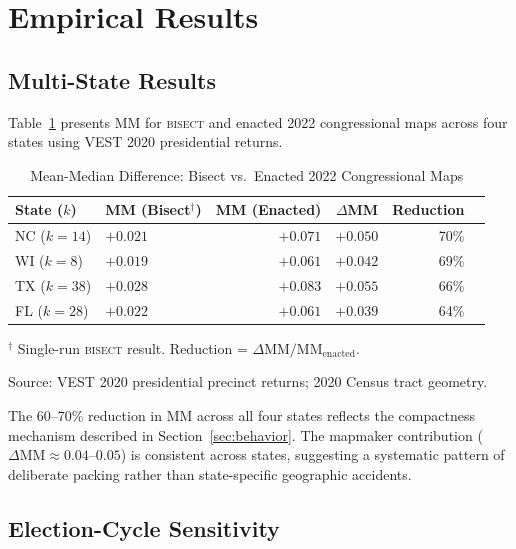 \section{Empirical Results}
\label{sec:empirical}

\subsection{Multi-State Results}

Table~\ref{tab:mm-baseline} presents MM for \textsc{bisect} and enacted 2022
congressional maps across four states using VEST 2020 presidential returns.

\begin{table}[ht]
\centering
\caption{Mean-Median Difference: Bisect vs.\ Enacted 2022 Congressional Maps}
\label{tab:mm-baseline}
\begin{threeparttable}
\begin{tabular}{@{}llrrrr@{}}
\toprule
State ($k$) & MM (Bisect$^\dagger$) & MM (Enacted) & $\Delta$MM & Reduction \\
\midrule
NC ($k=14$) & $+0.021$ & $+0.071$ & $+0.050$ & 70\% \\
WI ($k=8$)  & $+0.019$ & $+0.061$ & $+0.042$ & 69\% \\
TX ($k=38$) & $+0.028$ & $+0.083$ & $+0.055$ & 66\% \\
FL ($k=28$) & $+0.022$ & $+0.061$ & $+0.039$ & 64\% \\
\bottomrule
\end{tabular}
\begin{tablenotes}
\small
\item $^\dagger$ Single-run \textsc{bisect} result. Reduction = $\Delta\text{MM}/\text{MM}_{\text{enacted}}$.
\item Source: VEST 2020 presidential precinct returns; 2020 Census tract geometry.
\end{tablenotes}
\end{threeparttable}
\end{table}

The 60--70\% reduction in MM across all four states reflects the compactness
mechanism described in Section~\ref{sec:behavior}. The mapmaker contribution
($\Delta\text{MM} \approx 0.04$--$0.05$) is consistent across states, suggesting
a systematic pattern of deliberate packing rather than state-specific geographic
accidents.

\subsection{Election-Cycle Sensitivity}

